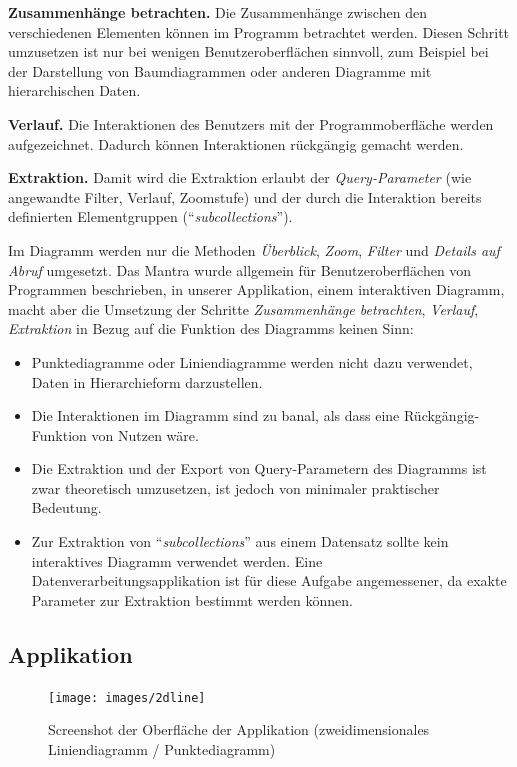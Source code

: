 \textbf{Zusammenhänge betrachten.} Die Zusammenhänge zwischen den verschiedenen Elementen können im Programm betrachtet werden. Diesen Schritt umzusetzen ist nur bei wenigen Benutzeroberflächen sinnvoll, zum Beispiel bei der Darstellung von Baumdiagrammen oder anderen Diagramme mit hierarchischen Daten.

\textbf{Verlauf.} Die Interaktionen des Benutzers mit der Programmoberfläche werden aufgezeichnet. Dadurch können Interaktionen rückgängig gemacht werden.

\textbf{Extraktion.} Damit wird die Extraktion erlaubt der \textit{Query-Parameter} (wie angewandte Filter, Verlauf, Zoomstufe) und der durch die Interaktion bereits definierten Elementgruppen ("`\textit{subcollections}"').

Im Diagramm werden nur die Methoden \textit{Überblick}, \textit{Zoom}, \textit{Filter} und \textit{Details auf Abruf} umgesetzt. Das Mantra wurde allgemein für Benutzeroberflächen von Programmen beschrieben, in unserer Applikation, einem interaktiven Diagramm, macht aber die Umsetzung der Schritte \textit{Zusammenhänge betrachten}, \textit{Verlauf}, \textit{Extraktion} in Bezug auf die Funktion des Diagramms keinen Sinn:

\begin{itemize}
	\item Punktediagramme oder Liniendiagramme werden nicht dazu verwendet, Daten in Hierarchieform darzustellen.
	\item Die Interaktionen im Diagramm sind zu banal, als dass eine Rückgängig-Funktion von Nutzen wäre.
	\item Die Extraktion und der Export von Query-Parametern des Diagramms ist zwar theoretisch umzusetzen, ist jedoch von minimaler praktischer Bedeutung.
	\item Zur Extraktion von "`\textit{subcollections}"' aus einem Datensatz sollte kein interaktives Diagramm verwendet werden. Eine Datenverarbeitungsapplikation ist für diese Aufgabe angemessener, da exakte Parameter zur Extraktion bestimmt werden können.
\end{itemize}

\newpage

\subsection{Applikation}

\begin{figure}[!htbp]
	\centering
	\texttt{[image: images/2dline]}
	\caption{Screenshot der Oberfläche der Applikation (zweidimensionales Liniendiagramm / Punktediagramm)}
	\label{fig:screenshot}
\end{figure}

